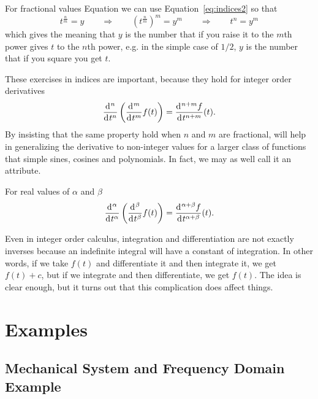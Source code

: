 For fractional values Equation we can use Equation~\ref{eq:indices2} so that
\begin{equation}
  t^\frac{n}{m} = y \qquad \Longrightarrow \qquad \left( t^\frac{n}{m} \right)^m = y^m \qquad \Longrightarrow \qquad t^n = y^m
\end{equation}
which gives the meaning that $y$ is the number that if you raise it to the $m$th power gives $t$ to the $n$th power, e.g. in the simple case of $1/2$, $y$ is the number that if you square you get $t$.

These exercises in indices are important, because they hold for integer order derivatives
\begin{equation}
  \frac{\operatorname{d}\hspace*{-1pt}^n}{\operatorname{d}\hspace*{-1pt} t^n} \left( \frac{\operatorname{d}\hspace*{-1pt}^m}{\operatorname{d}\hspace*{-1pt} t^m} f(t) \right) = \frac{\operatorname{d}\hspace*{-1pt}^{n+m} f}{\operatorname{d}\hspace*{-1pt} t^{n+m}}(t).
\end{equation}
By insisting that the same property hold when $n$ and $m$ are fractional, will help in generalizing the derivative to non-integer values for a larger class of functions that simple sines, cosines and polynomials. In fact, we may as well call it an attribute.

\begin{attribute}
  For real values of $\alpha$ and $\beta$
  \begin{equation}
    \frac{\operatorname{d}\hspace*{-1pt}^\alpha}{\operatorname{d}\hspace*{-1pt} t^\alpha} \left( \frac{\operatorname{d}\hspace*{-1pt}^\beta}{\operatorname{d}\hspace*{-1pt} t^\beta} f(t) \right) = \frac{\operatorname{d}\hspace*{-1pt}^{\alpha + \beta} f}{\operatorname{d}\hspace*{-1pt} t^{\alpha + \beta}}(t).
    \label{eq:derivindices}
  \end{equation}
\end{attribute}

Even in integer order calculus, integration and differentiation are not exactly inverses because an indefinite integral will have a constant of integration. In other words, if we take $f(t)$ and differentiate it and then integrate it, we get $f(t) + c$, but if we integrate and then differentiate, we get $f(t)$. The idea is clear enough, but it turns out that this complication does affect things.


\section{Examples}

\subsection{Mechanical System and Frequency Domain Example}

